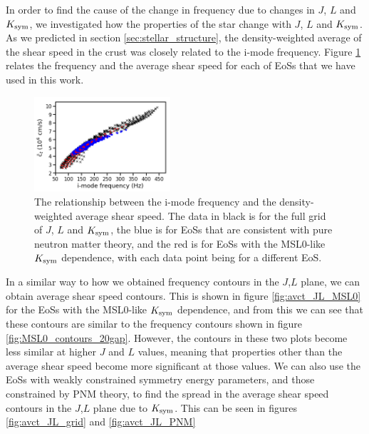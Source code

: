 \documentclass[fleqn,usenatbib]{mnras}
\begin{document}
\hspace{\parindent}In order to find the cause of the change in frequency due to changes in $J$, $L$ and $K_{\rm sym}$, we investigated how the properties of the star change with $J$, $L$ and $K_{\rm sym}$. As we predicted in section \ref{sec:stellar_structure}, the density-weighted average of the shear speed in the crust was closely related to the i-mode frequency. Figure \ref{fig:f_avct_MSL0} relates the frequency and the average shear speed for each of EoSs that we have used in this work.


\begin{figure}
\centering
\includegraphics[width=0.45\textwidth,angle=0]{f_vs_avct_grid_PNM_MSL0.png}
\caption{The relationship between the i-mode frequency and the density-weighted average shear speed. The data in black is for the full grid of $J$, $L$ and $K_{\rm sym}$, the blue is for EoSs that are consistent with pure neutron matter theory, and the red is for EoSs with the MSL0-like $K_{\rm sym}$ dependence, with each data point being for a different EoS.}
\label{fig:f_avct_MSL0}
\end{figure}

In a similar way to how we obtained frequency contours in the $J$,$L$ plane, we can obtain average shear speed contours. This is shown in figure \ref{fig:avct_JL_MSL0} for the EoSs with the MSL0-like $K_{\rm sym}$ dependence, and from this we can see that these contours are similar to the frequency contours shown in figure \ref{fig:MSL0_contours_20gap}. However, the contours in these two plots become less similar at higher $J$ and $L$ values, meaning that properties other than the average shear speed become more significant at those values. We can also use the EoSs with weakly constrained symmetry energy parameters, and those constrained by PNM theory, to find the spread in the average shear speed contours in the $J$,$L$ plane due to $K_{\rm sym}$. This can be seen in figures \ref{fig:avct_JL_grid} and \ref{fig:avct_JL_PNM}
\end{document}
